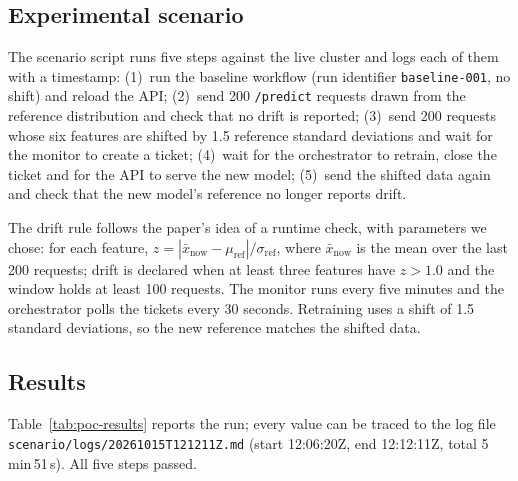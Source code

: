 \subsection{Experimental scenario}

The scenario script runs five steps against the live cluster and logs each of them with a timestamp:
(1)~run the baseline workflow (run identifier \texttt{baseline-001}, no shift) and reload the API;
(2)~send 200 \texttt{/predict} requests drawn from the reference distribution and check that no drift is reported;
(3)~send 200 requests whose six features are shifted by 1.5 reference standard deviations and wait for the monitor to create a ticket;
(4)~wait for the orchestrator to retrain, close the ticket and for the API to serve the new model;
(5)~send the shifted data again and check that the new model's reference no longer reports drift.

The drift rule follows the paper's idea of a runtime check, with parameters we chose: for each feature, $z = |\bar{x}_{\text{now}} - \mu_{\text{ref}}| / \sigma_{\text{ref}}$, where $\bar{x}_{\text{now}}$ is the mean over the last 200 requests; drift is declared when at least three features have $z > 1.0$ and the window holds at least 100 requests.
The monitor runs every five minutes and the orchestrator polls the tickets every 30 seconds.
Retraining uses a shift of 1.5 standard deviations, so the new reference matches the shifted data.

\subsection{Results}

Table~\ref{tab:poc-results} reports the run; every value can be traced to the log file \texttt{scenario/logs/20261015T121211Z.md} (start 12:06:20Z, end 12:12:11Z, total 5\,min\,51\,s). All five steps passed.

